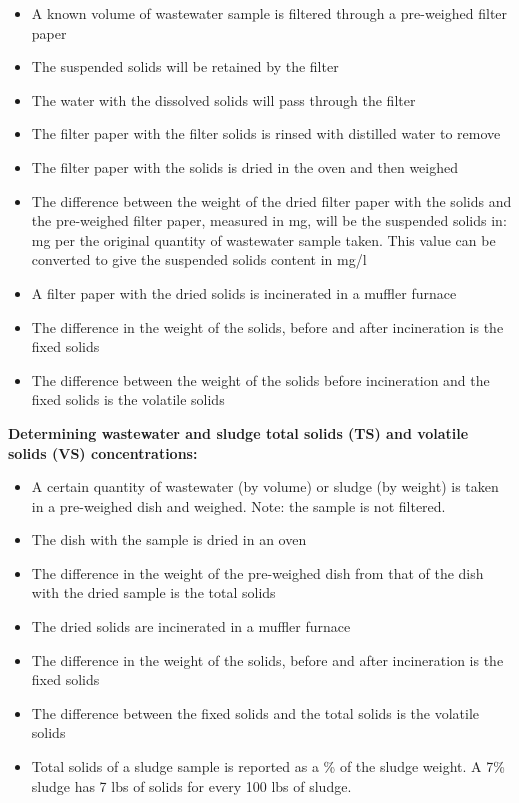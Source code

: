 				\begin{itemize}
					\item A known volume of wastewater sample is filtered through a pre-weighed filter paper
					\item The suspended solids will be retained by the filter
					\item The water with the dissolved solids will pass through the filter
					\item The filter paper with the filter solids is rinsed with distilled water to remove 
					\item The filter paper with the solids is dried in the oven and then weighed
					\item The difference between the weight of the dried filter paper with the solids and the pre-weighed filter paper, measured in mg, will be the suspended solids in: mg per the original quantity of wastewater sample taken.  This value can be converted to give the suspended solids content in mg/l
					\item A filter paper with the dried solids is incinerated in a muffler furnace
					\item The difference in the weight of the solids, before and after incineration is the fixed solids
					\item The difference between the weight of the solids before incineration and the fixed solids is the volatile solids
				\end{itemize}
				
	\textbf{Determining wastewater and sludge total solids (TS) and volatile solids (VS) concentrations:}\\	
				
				\begin{itemize}
					\item A certain quantity of wastewater (by volume) or sludge (by weight) is taken in a pre-weighed dish and weighed.  Note:  the sample is not filtered.
					\item The dish with the sample is dried in an oven
					\item The difference in the weight of the pre-weighed dish from that of the dish with the dried sample is the total solids
					\item The dried solids are incinerated in a muffler furnace
					\item The difference in the weight of the solids, before and after incineration is the fixed solids
					\item The difference between the fixed solids and the total solids is the volatile solids
					\item Total solids of a sludge sample is reported as a \% of the sludge weight.  A 7\% sludge has 7 lbs of solids for every 100 lbs of sludge.
				\end{itemize}
				
